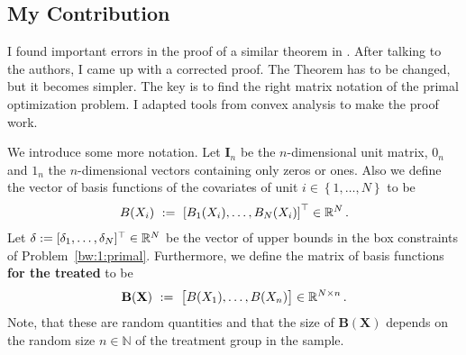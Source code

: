 \subsection*{My Contribution}
I found important errors in the proof of a similar theorem in \cite{Wang2019}. After talking to the authors, I came up with a corrected proof. The Theorem has to be changed, but it becomes simpler. The key is to find the right matrix notation of the primal optimization problem. I adapted tools from convex analysis to make the proof work.

We introduce some more notation. Let $\mathbf{I}_n$ be the $n$-dimensional unit matrix, $\mathrm{0}_n$ and $\mathrm{1}_n$ the $n$-dimensional vectors containing only zeros or ones.
Also we define the vector of basis functions of the covariates of unit 
$i\in \left\{ 1,\ldots,N \right\}$ to be
\begin{gather*}
     B(X_i)
    \ 
    :=
    \ 
    \left[ 
      B_1(X_i)
      ,
      \ldots
      ,
      B_N(X_i)
    \right]
    ^\top
    \in
    \R^N
    \,.
\end{gather*}
Let $\delta:=[\delta_1,\ldots,\delta_N]^\top\in \mathbb{R}^N$ be the vector of upper bounds in the box constraints of Problem~\ref{bw:1:primal}.
Furthermore, we define the matrix of basis functions \textbf{for the treated} to be
\begin{gather*}
    \mathbf{B}(\mathbf{X})
    \ 
    :=
    \ 
    \begin{bmatrix}
      B(X_1), \ldots, B(X_n)
    \end{bmatrix}
    \in\R^{N\times n}
    \,.
\end{gather*}
Note, that these are random quantities and that the size of $\mathbf{B}(\mathbf{X})$ depends on the random size $n\in\mathbb{N}$ of the treatment group in the sample.


